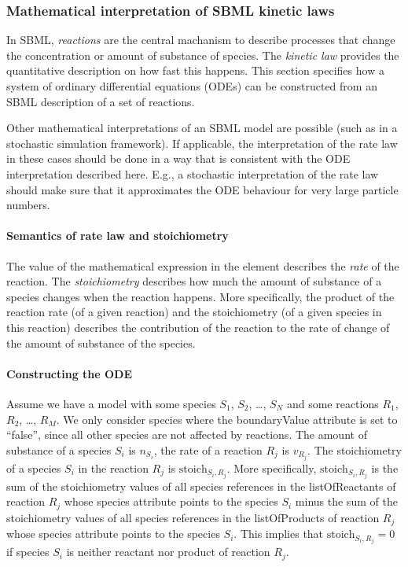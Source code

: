 \subsubsection{Mathematical interpretation of SBML kinetic laws}
\label{sec:about-kinetic-laws}

In SBML, \emph{reactions} are the central machanism to describe processes that
change the concentration or amount of substance of species. The \emph{kinetic law} 
provides the quantitative description on how fast this happens. This section 
specifies how a system of ordinary differential equations (ODEs) can be constructed 
from an SBML description of a set of reactions.  

Other mathematical interpretations of an SBML model are possible (such as in a
stochastic simulation framework). If applicable, the interpretation of the
rate law in these cases should be done in a way that is consistent with the 
ODE interpretation described here. E.g., a stochastic interpretation of the rate
law should make sure that it approximates the ODE behaviour for very large particle 
numbers. 

\paragraph{Semantics of rate law and stoichiometry}

The value of the mathematical expression in the  element describes the
\emph{rate} of the reaction. The \emph{stoichiometry} describes how much the amount
of substance of a species changes when the reaction happens. More specifically, 
the product of the reaction rate (of a given reaction) and the stoichiometry
(of a given species in this reaction)
describes the contribution of the reaction to the rate of change of the amount of 
substance of the species.

\paragraph{Constructing the ODE}

Assume we have a model with some species $S_{1}$, $S_{2}$, \ldots{},
$S_{N}$ and some reactions $R_{1}$, $R_{2}$, \ldots{}, $R_{M}$.
We only consider species where the {boundaryValue} attribute is set
to {}``false'', since all other species are not affected by reactions.
The amount of substance of a species $S_{i}$ is $n_{S_{i}}$, the
rate of a reaction $R_{j}$ is $v_{R_{j}}$. The stoichiometry of
a species $S_{i}$ in the reaction $R_{j}$ is $\text{stoich}{}_{S_{i},R_{j}}$.
More specifically, $\textrm{stoich}_{S_{i},R_{j}}$ is the sum of
the stoichiometry values of all species references in the listOfReactants
of reaction $R_{j}$ whose species attribute points to the species
$S_{i}$ minus the sum of the stoichiometry values of all species
references in the listOfProducts of reaction $R_{j}$ whose species
attribute points to the species $S_{i}$. This implies that $\textrm{stoich}_{S_{i},R_{j}}=0$
if species $S_{i}$ is neither reactant nor product of reaction $R_{j}$.


